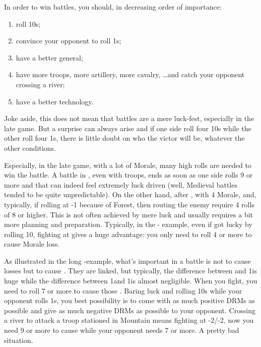 \begin{playtip}
  In order to win battles, you should, in decreasing order of importance:
  \begin{enumerate}
  \item roll 10s;
  \item convince your opponent to roll 1s;
  \item have a better general;
  \item have more troops, more artillery, more cavalry, \ldots and catch your
    opponent crossing a river;
  \item have a better technology.
  \end{enumerate}
  Joke aside, this does not mean that battles are a mere luck-fest, especially
  in the late game. But a surprise can always arise and if one side roll four
  10s while the other roll four 1s, there is little doubt on who the victor
  will be, whatever the other conditions.

  Especially, in the late game, with a lot of Morale, many high rolls are
  needed to win the battle. A battle in \TMED, even with 
  troops, ends as soon as one side rolls 9 or more and that can indeed feel
  extremely luck driven (well, Medieval battles tended to be quite
  unpredictable). On the other hand, after \TMUS, with 4 Morale, and,
  typically, if rolling at -1 because of Forest, then routing the enemy
  require 4 rolls of 8 or higher. This is not often achieved by mere luck and
  usually requires a bit more planning and preparation. Typically, in the
  \SUE- example, even if \SUE got lucky by rolling 10,
  fighting at  gives a huge advantage: you only need to roll 4 or
  more to cause Morale loss.

  As illustrated in the long \FRA-\HIS example, what's important in a battle
  is not to cause losses but to cause \textetoile. They are linked, but
  typically, the difference between \texttd and 1\textetoile is huge while the
  difference between 1\textetoile and 1\texttu\textetoile is almost
  negligible. When you fight, you need to roll 7 or more to cause those
  \textetoile. Baring luck and rolling 10s while your opponent rolls 1s, you
  best possibility is to come with as much positive DRMs as possible and give
  as much negative DRMs as possible to your opponent. Crossing a river to
  attack a troop stationed in Mountain means fighting at -2/-2, now you need 9
  or more to cause \textetoile while your opponent needs 7 or more. A pretty
  bad situation.
\end{playtip}

